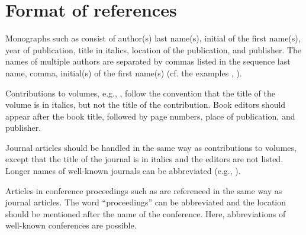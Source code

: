 \documentclass{tls}
\begin{document}
\section{Format of references}

Monographs such as \citet{Fant:1960} consist of author(s) last name(s), initial of the first name(s), year of publication, title in italics, location of the publication, and publisher. The names of multiple authors are separated by commas listed in the sequence last name, comma, initial(s) of the first name(s) (cf. the examples , ).

Contributions to volumes, e.g., \citet{Stevens:1999}, follow the convention that the title of the volume is in italics, but not the title of the contribution. Book editors should appear after the book title, followed by page numbers, place of publication, and publisher.

Journal articles should be handled in the same way as contributions to volumes, except that the title of the journal is in italics and the editors are not listed. Longer names of well-known journals can be abbreviated (e.g., ).

Articles in conference proceedings such as \citet{Ladefoged:2003} are referenced in the same way as journal articles. The word ``proceedings'' can be abbreviated and the location should be mentioned after the name of the conference. Here, abbreviations of well-known conferences are possible.


\end{document}
